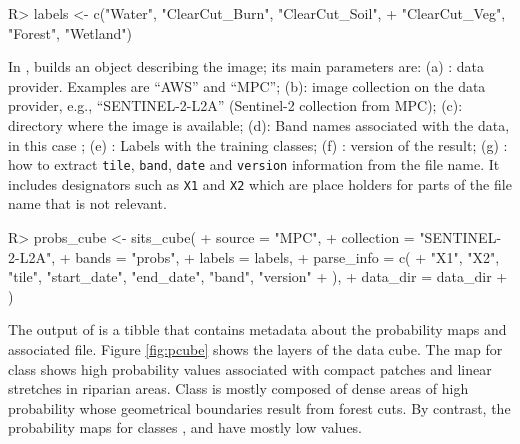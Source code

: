 \documentclass[
]{jss}
\begin{document}
\begin{CodeChunk}
\begin{CodeInput}
R> labels <- c("Water", "ClearCut_Burn", "ClearCut_Soil",
+             "ClearCut_Veg", "Forest", "Wetland")
\end{CodeInput}
\end{CodeChunk}

In ,  builds an object describing the image; its main parameters are: (a) : data provider. Examples are ``AWS'' and ``MPC''; (b): image collection on the data provider, e.g., ``SENTINEL-2-L2A'' (Sentinel-2 collection from MPC); (c): directory where the image is available; (d): Band names associated with the data, in this case ; (e) : Labels with the training classes; (f) : version of the result; (g) : how to extract \texttt{tile}, \texttt{band}, \texttt{date} and \texttt{version} information from the file name. It includes designators such as \texttt{X1} and \texttt{X2} which are place holders for parts of the file name that is not relevant.

\begin{CodeChunk}
\begin{CodeInput}
R> probs_cube <- sits_cube(
+   source = "MPC",
+   collection = "SENTINEL-2-L2A",
+   bands = "probs",
+   labels = labels,
+   parse_info = c(
+     "X1", "X2", "tile", "start_date", "end_date", "band", "version"
+   ),
+   data_dir = data_dir
+ )
\end{CodeInput}
\end{CodeChunk}

The output of  is a tibble that contains metadata about the probability maps and associated file. Figure \ref{fig:pcube} shows the layers of the data cube. The map for class  shows high probability values associated with compact patches and linear stretches in riparian areas. Class  is mostly composed of dense areas of high probability whose geometrical boundaries result from forest cuts. By contrast, the probability maps for classes ,  and  have mostly low values.
\end{document}
